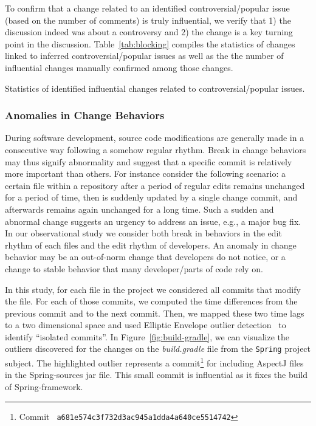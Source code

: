 To confirm that a change related to an identified controversial/popular issue (based on the number of comments) is truly influential,
we verify that 1) the discussion indeed was about a controversy and 2) the change is a key turning point in the discussion.
Table~\ref{tab:blocking}
compiles the statistics of changes linked to inferred controversial/popular issues as well as the
the number of influential changes manually confirmed among those changes.

\begin{table}[h!]
\centering
\caption{Statistics of identified influential changes related to controversial/popular issues.}

\label{tab:blocking}
\end{table}


\subsubsection{Anomalies in Change Behaviors}
\label{sec:isolated}

During software development, source code modifications
are generally made in a consecutive way following a somehow regular rhythm.
Break in change behaviors may thus signify abnormality and suggest
that a specific commit is relatively more important than others. 
For instance consider the following scenario: a certain file within a repository
after a period of regular edits remains unchanged for a period
of time, then is suddenly updated by a single change commit, and afterwards
remains again unchanged for a long time. Such a sudden and abnormal change 
suggests an urgency to address an issue, e.g., a major bug fix.
In our observational study we consider both break in behaviors in the edit rhythm
of each files and the edit rhythm of developers.
An anomaly in change behavior may be an out-of-norm change that developers do not notice,
 or a change to stable behavior that many developer/parts of code rely on.

In this study, for each file in the project we considered all commits that
modify the file. For each of those commits, we computed the time differences
from the previous commit and to the next commit. Then, we mapped these two time
lags to a two dimensional space and used Elliptic Envelope outlier detection~\cite{rousseeuw1999fast} to
identify ``isolated commits''.
In Figure~\ref{fig:build-gradle}, we can visualize the outliers discovered for
the changes on the {\em build.gradle} file from the {\tt Spring} project
subject.
The highlighted outlier represents a commit\footnote{Commit \tt\small
a681e574c3f732d3ac945a1dda4a640ce5514742} for including AspectJ files in the
Spring-sources jar file. This small commit is influential as it
fixes the build of Spring-framework.


